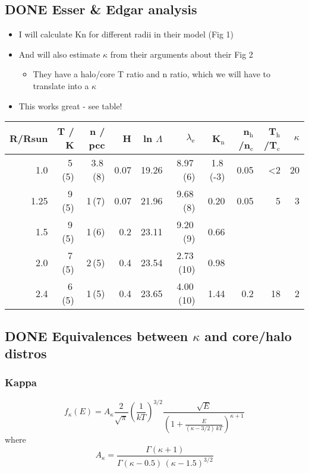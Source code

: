 \documentclass[11pt]{article}
\begin{document}
\subsection{{\bfseries\sffamily DONE} Esser \& Edgar analysis}
\label{sec:orgheadline19}
\begin{itemize}
\item I will calculate Kn for different radii in their model (Fig 1)
\item And will also estimate \(\kappa\) from their arguments about their Fig 2
\begin{itemize}
\item They have a halo/core T ratio and n ratio, which we will have to translate into a \(\kappa\)
\end{itemize}
\item This works great - see table!
\end{itemize}
\begin{center}
\begin{tabular}{rrrrrrrrrr}
R/Rsun & T / K & n / pcc & H & ln \(\Lambda\) & \(\lambda_{\text{e}}\) & K\(_{\text{n}}\) & n\(_{\text{h}}\)/n\(_{\text{c}}\) & T\(_{\text{h}}\)/T\(_{\text{c}}\) & \(\kappa\)\\
\hline
1.0 & 5\,(5) & 3.8\,(8) & 0.07 & 19.26 & 8.97\,(6) & 1.8\,(-3) & 0.05 & <2 & 20\\
1.25 & 9\,(5) & 1\,(7) & 0.07 & 21.96 & 9.68\,(8) & 0.20 & 0.05 & 5 & 3\\
1.5 & 9\,(5) & 1\,(6) & 0.2 & 23.11 & 9.20\,(9) & 0.66 &  &  & \\
2.0 & 7\,(5) & 2\,(5) & 0.4 & 23.54 & 2.73\,(10) & 0.98 &  &  & \\
2.4 & 6\,(5) & 1\,(5) & 0.4 & 23.65 & 4.00\,(10) & 1.44 & 0.2 & 18 & 2\\
\end{tabular}
\end{center}

\subsection{{\bfseries\sffamily DONE} Equivalences between \(\kappa\) and core/halo distros}
\label{sec:orgheadline23}
\subsubsection{Kappa}
\label{sec:orgheadline20}
\[
f_{\kappa}(E) = 
A_{\kappa} \frac{2}{\sqrt{\pi}}
\left(\frac{1}{k T}\right)^{3/2}
\frac{\sqrt{E}}{
\left(1 + \frac{E}{(\kappa - 3/2)\, k T}\right)^{\kappa + 1}
}
\] 
where
\[
A_{\kappa} = \frac{ \Gamma(\kappa + 1) }{\Gamma(\kappa - 0.5) \, (\kappa - 1.5)^{3/2}}
\]
\end{document}
